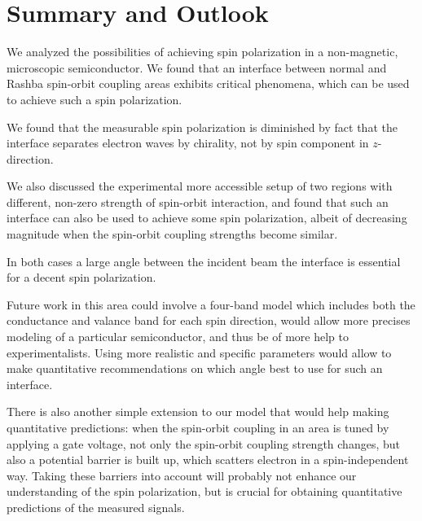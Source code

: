 \chapter{Summary and Outlook}
\label{sec:summary}

We analyzed the possibilities of achieving spin polarization in a
non-magnetic, microscopic semiconductor. We found that an interface between
normal and Rashba spin-orbit coupling areas exhibits critical phenomena, which
can be used to achieve such a spin polarization.

We found that the measurable spin polarization is diminished by fact that the
interface separates electron waves by chirality, not by spin component
in $z$-direction.

We also discussed the experimental more accessible setup of two regions with
different, non-zero strength of spin-orbit interaction, and found that such an
interface can also be used to achieve some spin polarization, albeit
of decreasing magnitude when the spin-orbit coupling strengths become similar. 

In both cases a large angle between the incident beam the interface is
essential for a decent spin polarization.


Future work in this area could involve a four-band model which includes both
the conductance and valance band for each spin direction, would
allow more precises modeling of a particular semiconductor, and thus be of
more help to experimentalists. Using more realistic and specific parameters
would allow to make quantitative recommendations on which angle best to use
for such an interface.

There is also another simple extension to our model that would help making
quantitative predictions: when the spin-orbit coupling in an area is tuned by
applying a gate voltage, not only the spin-orbit coupling strength changes,
but also a potential barrier is built up, which scatters electron in a
spin-independent way. Taking these barriers into account will probably not
enhance our understanding of the spin polarization, but is crucial for
obtaining quantitative predictions of the measured signals.

